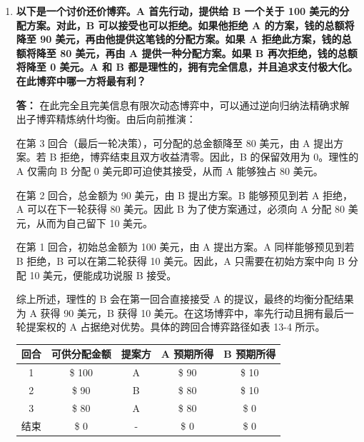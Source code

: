\begin{enumerate}[label=\textbf{\arabic*.}, leftmargin=*]
		若博弈转变为对手在 10 次博弈中始终率先宣布产量，在完全理性假设下，你每一期都只能被动做出反应，生产 7.5 并获得 56.25 的单期利润。然而在多阶段博弈中，你也可以尝试通过前期的惩罚来改变对手的预期。例如在前期当对手宣布 15 时，你执意同样宣布 15，这虽会导致当期利润降至 0，但只要这种玉石俱焚的威胁让对手确信你在后继期仍会实施，便能逼迫对手在后续各期退缩至古诺产量 10，从而在后续各期将你的利润提升至 100。这种策略是否占优，取决于对手对你惩罚可信性的评估，以及你对跨期未来总利润的贴现程度。
		\newpage
		\item \textbf{以下是一个讨价还价博弈。A 首先行动，提供给 B 一个关于 100 美元的分配方案。对此，B 可以接受也可以拒绝。如果他拒绝 A 的方案，钱的总额将降至 90 美元，再由他提供这笔钱的分配方案。如果 A 拒绝此方案，钱的总额将降至 80 美元，再由 A 提供一种分配方案。如果 B 再次拒绝，钱的总额将降至 0 美元。A 和 B 都是理性的，拥有完全信息，并且追求支付极大化。在此博弈中哪一方将最有利？}
		
		\textbf{答：}
		在此完全且完美信息有限次动态博弈中，可以通过逆向归纳法精确求解出子博弈精炼纳什均衡。由后向前推演：
		
		在第 3 回合（最后一轮决策），可分配的总金额降至 80 美元，由 A 提出方案。若 B 拒绝，博弈结束且双方收益清零。因此，B 的保留效用为 0。理性的 A 仅需向 B 分配 0 美元即可迫使其接受，从而 A 能够独占 80 美元。
		
		在第 2 回合，总金额为 90 美元，由 B 提出方案。B 能够预见到若 A 拒绝，A 可以在下一轮获得 80 美元。因此 B 为了使方案通过，必须向 A 分配 80 美元，从而为自己留下 10 美元。
		
		在第 1 回合，初始总金额为 100 美元，由 A 提出方案。A 同样能够预见到若 B 拒绝，B 可以在第二轮获得 10 美元。因此，A 只需要在初始方案中向 B 分配 10 美元，便能成功说服 B 接受。
		
		综上所述，理性的 B 会在第一回合直接接受 A 的提议，最终的均衡分配结果为 A 获得 90 美元，B 获得 10 美元。在这场博弈中，率先行动且拥有最后一轮提案权的 A 占据绝对优势。具体的跨回合博弈路径如表 13-4 所示。
		
		\begin{center}
			\small
			\renewcommand{\arraystretch}{1.3}
			\setlength{\tabcolsep}{3pt}
			\begin{tabular}{|c|c|c|c|c|}
				\hline
				\textbf{回合} & \textbf{可供分配金额} & \textbf{提案方} & \textbf{A 预期所得} & \textbf{B 预期所得} \\
				\hline
				1 & \$ 100 & A & \$ 90 & \$ 10 \\
				2 & \$ 90  & B & \$ 80 & \$ 10 \\
				3 & \$ 80  & A & \$ 80 & \$ 0  \\
				结束 & \$ 0   & - & \$ 0  & \$ 0  \\
				\hline
			\end{tabular}
		\end{center}
		

\end{enumerate}
